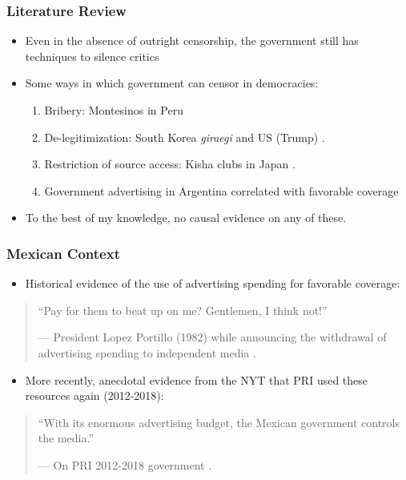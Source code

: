 \documentclass[12pt]{beamer}
\begin{document}
\begin{frame}
\frametitle{Literature Review}

\small
\begin{itemize}
\item Even in the absence of outright censorship, the government still has techniques to silence critics \citep{Censor-Pratt-AER, Autocracy-Guriev-JPE}

\item Some ways in which government can censor in democracies: 

\begin{enumerate}
    \item Bribery: Montesinos in Peru \citep{Peru-Macmillan-JEP}
    \item De-legitimization: South Korea \textit{giraegi} and US (Trump) \citep{KoreaJour-Shin-Journalism, PressCriticism-Carlson-Journalism}.
    \item Restriction of source access: Kisha clubs in Japan \citep{Kisha-Freedom}.
    \item Government advertising in Argentina correlated with favorable coverage \citep{ArgCorr-DiTella-AEJAE}
\end{enumerate}

\item To the best of my knowledge, no causal evidence on any of these.
\end{itemize}
\end{frame}

\begin{frame}
\frametitle{Mexican Context}

\small

\begin{itemize}
    \item Historical evidence of the use of advertising spending for favorable coverage:
\end{itemize}
\begin{quote} 
\centering 
``Pay for them to beat up on me? Gentlemen, I think not!''

\hfill --- \tiny{President Lopez Portillo (1982) while announcing the withdrawal of advertising spending to independent media \citep{PrensaVendida}.}
\end{quote}


\begin{itemize}
    \item More recently, anecdotal evidence from the NYT that PRI used these resources again (2012-2018):
\end{itemize}

\begin{quote} 
\centering 
``With its enormous advertising budget, the Mexican government controls the media.''

\hfill --- \tiny{On PRI 2012-2018 government \citep{Times}.}
\end{quote}


\end{frame}
\end{document}
